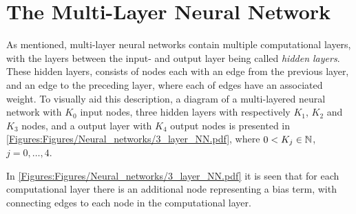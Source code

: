 \section{The Multi-Layer Neural Network}
As mentioned, multi-layer neural networks contain multiple computational layers, with the layers between the input- and output layer being called \emph{hidden layers}. These hidden layers, consists of nodes each with an edge from the previous layer, and an edge to the preceding layer, where each of edges have an associated weight. To visually aid this description, a diagram of a multi-layered neural network with $K_0$ input nodes, three hidden layers with respectively $K_1$, $K_2$ and $K_3$ nodes, and a output layer with $K_4$ output nodes is presented in \autoref{Figures:Figures/Neural_networks/3_layer_NN.pdf}, where $0<K_j \in \mathbb{N}$, $j = 0,\ldots, 4$.

In \autoref{Figures:Figures/Neural_networks/3_layer_NN.pdf} it is seen that for each computational layer there is an additional node representing a bias term, with connecting edges to each node in the computational layer.

